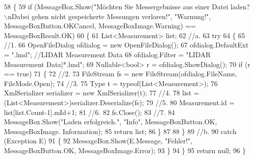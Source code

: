 \begin{DoxyCode}
58         \{
59             \textcolor{keywordflow}{if} (MessageBox.Show(\textcolor{stringliteral}{"Möchten Sie Messergebnisse aus einer Datei laden?\(\backslash\)nDabei gehen nicht
       gespeicherte Messungen verloren!"}, \textcolor{stringliteral}{"Warnung!"}, MessageBoxButton.OKCancel, MessageBoxImage.Warning) == 
      MessageBoxResult.OK)
60             \{
61                 List<Measurement> list;
62                 \textcolor{comment}{//a.}
63                 \textcolor{keywordflow}{try}
64                 \{
65                     \textcolor{comment}{//1.}
66                     OpenFileDialog ofdialog = \textcolor{keyword}{new} OpenFileDialog();
67                     ofdialog.DefaultExt = \textcolor{stringliteral}{".lmd"}; \textcolor{comment}{//LIDAR Measurement Data}
68                     ofdialog.Filter = \textcolor{stringliteral}{"LIDAR Measurement Data|*.lmd"};
69                     Nullable<bool> r = ofdialog.ShowDialog();
70                     \textcolor{keywordflow}{if} (r == \textcolor{keyword}{true})
71                     \{
72                         \textcolor{comment}{//2.}
73                         FileStream fs = \textcolor{keyword}{new} FileStream(ofdialog.FileName, FileMode.Open);
74                         \textcolor{comment}{//3.}
75                         Type t = typeof(List<Measurement>);
76                         XmlSerializer serializer = \textcolor{keyword}{new} XmlSerializer(t);
77                         \textcolor{comment}{//4.}
78                         list = (List<Measurement>)serializer.Deserialize(fs);
79                         \textcolor{comment}{//5.}
80                         Measurement.id = list[list.Count-1].mId+1;
81                         \textcolor{comment}{//6.}
82                         fs.Close();
83                         \textcolor{comment}{//7.}
84                         MessageBox.Show(\textcolor{stringliteral}{"Laden erfolgreich."}, \textcolor{stringliteral}{"Info"}, MessageBoxButton.OK, MessageBoxImage.
      Information);
85                         \textcolor{keywordflow}{return} list;
86                     \}
87 
88                 \}
89                 \textcolor{comment}{//b.}
90                 \textcolor{keywordflow}{catch} (Exception E)
91                 \{
92                     MessageBox.Show(E.Message, \textcolor{stringliteral}{"Fehler!"}, MessageBoxButton.OK, MessageBoxImage.Error);
93                 \}
94             \}
95             \textcolor{keywordflow}{return} null;
96             \}
\end{DoxyCode}
